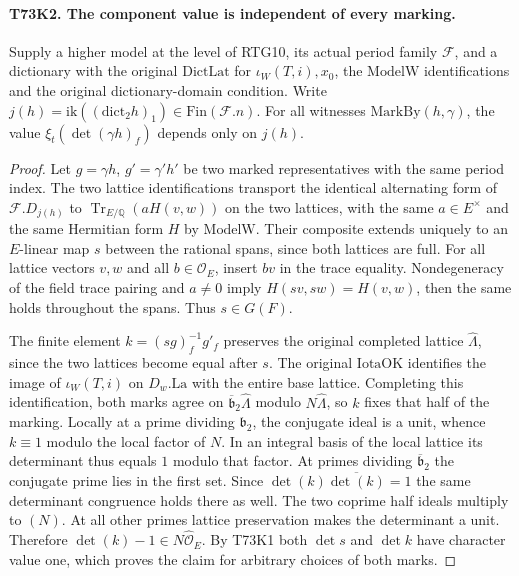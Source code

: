 \paragraph{T73K2. The component value is independent of every marking.}
\label{claim:T73K2}
Supply a higher model at the level of RTG10, its actual period family
$\mathcal F$, and a dictionary with the original $\mathrm{DictLat}$
for $\iota_W(T,i),x_0$, the $\mathrm{ModelW}$ identifications and the
original dictionary-domain condition. Write $j(h)=
\mathrm{ik}((\mathrm{dict}_2 h)_1)\in\mathrm{Fin}(\mathcal F.n)$.
For all witnesses $\mathrm{MarkBy}(h,\gamma)$, the value
$\xi_t(\det(\gamma h)_f)$ depends only on $j(h)$.

\begin{proof}
Let $g=\gamma h$, $g'=\gamma' h'$ be two marked representatives
with the same period index. The two lattice identifications transport
the identical alternating form of $\mathcal F.D_{j(h)}$ to
$\operatorname{Tr}_{E/\mathbb Q}(aH(v,w))$ on the two lattices,
with the same $a\in E^\times$ and the same Hermitian form $H$ by
$\mathrm{ModelW}$. Their composite extends uniquely to an
$E$-linear map $s$ between the rational spans, since both lattices are
full. For all lattice vectors $v,w$ and all $b\in\mathcal O_E$, insert
$bv$ in the trace equality. Nondegeneracy of the field trace pairing
and $a\ne0$ imply $H(sv,sw)=H(v,w)$, then the same holds throughout
the spans. Thus $s\in G(F)$.

The finite element $k=(sg)_f^{-1}g'_f$ preserves the original
completed lattice $\widehat\Lambda$, since the two lattices become
equal after $s$. The original $\mathrm{IotaOK}$ identifies the image
of $\iota_W(T,i)$ on $D_w.\mathrm{La}$ with the entire base lattice.
Completing this identification, both marks agree on
$\overline{\mathfrak b}_2\widehat\Lambda$ modulo
$N\widehat\Lambda$, so $k$ fixes that half of the marking.
Locally at a prime dividing $\mathfrak b_2$, the conjugate ideal is
a unit, whence $k\equiv 1$ modulo the local factor of $N$.
In an integral basis of the local lattice its determinant thus equals
$1$ modulo that factor. At primes dividing
$\overline{\mathfrak b}_2$ the conjugate prime lies in the first set.
Since $\det(k)\overline{\det(k)}=1$ the same determinant congruence
holds there as well. The two coprime half ideals multiply to $(N)$.
At all other primes lattice preservation makes the determinant a unit.
Therefore $\det(k)-1\in N\widehat{\mathcal O}_E$. By T73K1 both
$\det s$ and $\det k$ have character value one, which proves the
claim for arbitrary choices of both marks.
\end{proof}

